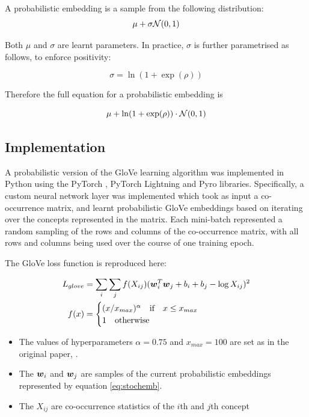 A probabilistic embedding is a sample from the following distribution:
\begin{equation}
    \mu + \sigma \mathcal{N}(0, 1)
\end{equation}

Both $\mu$ and $\sigma$ are learnt parameters. In practice, $\sigma$ is further parametrised as follows, to enforce positivity:

\begin{equation}
    \sigma = \ln (1 + \exp (\rho))
\end{equation}

Therefore the full equation for a probabilistic embedding is 

\begin{equation}
\label{eq:stochemb}
    \mu + \ln (1 + \exp(\rho)) \cdot \mathcal{N}(0, 1)
\end{equation}

\subsection{Implementation}

A probabilistic version of the GloVe learning algorithm was implemented in Python using the PyTorch \cite{pytorch}, PyTorch Lightning \cite{pytorchlightning} and Pyro \cite{pyro} libraries. Specifically, a custom neural network layer was implemented which took as input a co-occurrence matrix, and learnt probabilistic GloVe embeddings based on iterating over the concepts represented in the matrix. Each mini-batch represented a random sampling of the rows and columns of the co-occurrence matrix, with all rows and columns being used over the course of one training epoch. 

The GloVe loss function is reproduced here:

\begin{equation}
\label{eq:gloveloss}
\begin{split}
L_{glove} &= \sum_i \sum_j f(X_{ij}) (\boldsymbol{w}_i^T \boldsymbol{w}_j + b_i + b_j - \log X_{ij})^2\\
f(x) &= \begin{cases}
(x/x_{max})^{\alpha}\quad \text{if} \quad x \le x_{max}\\
1\quad \text{otherwise} \quad
\end{cases}
\end{split}
\end{equation}

\begin{itemize}
    \item The values of hyperparameters $\alpha = 0.75$ and $x_{max} = 100$  are set as in the original paper, \cite{pennington2014glove}. 
    \item The $\boldsymbol{w}_i$ and $\boldsymbol{w}_j$ are samples of the current probabilistic embeddings represented by equation \ref{eq:stochemb}. 
    \item The $X_{ij}$ are co-occurrence statistics of the $i$th and $j$th concept
\end{itemize}

